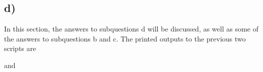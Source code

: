 \subsection*{d)}
In this section, the answers to subquestions d will be discussed, as well as some of the answers to subquestions b and c.
The printed outputs to the previous two scripts are

and
